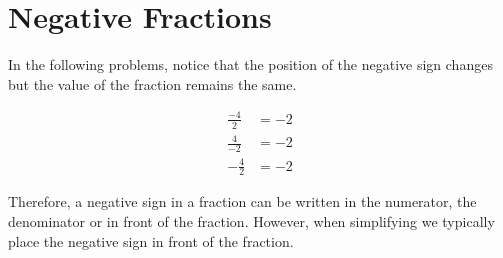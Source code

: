 \documentclass[handout, font=12pt]{ximera}
\begin{document}
\section*{Negative Fractions}

In the following problems, notice that the position of the negative sign changes but the value
of the fraction remains the same.

\begin{align*}
\frac{-4}{2} &= -2 \\[3ex]
\frac{4}{-2} &= -2 \\[3ex]
-\frac{4}{2} &= -2
\end{align*}

Therefore, a negative sign in a fraction can be written in the numerator, the denominator or in front
of the fraction.  However, when simplifying we typically place the negative sign in front of the fraction.
\end{document}
